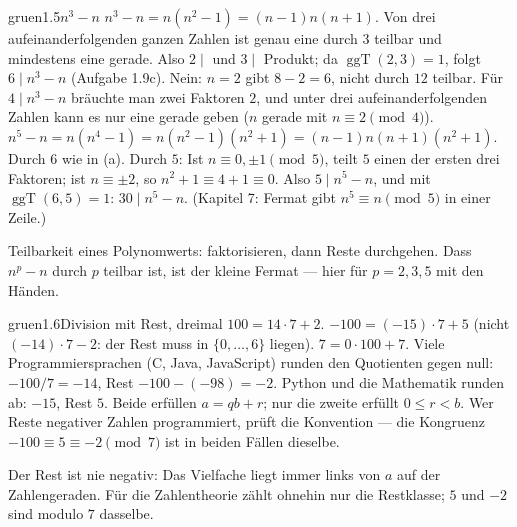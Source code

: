 \begin{loesungkarte}{gruen}{1.5}{$n^{3} - n$}
$n^{3} - n = n(n^{2} - 1) = (n - 1)n(n + 1)$. Von drei aufeinanderfolgenden ganzen Zahlen ist genau eine durch $3$ teilbar und mindestens eine gerade. Also $2\mid$ und $3\mid$ Produkt; da $\operatorname{ggT}(2, 3) = 1$, folgt $6\mid n^{3} - n$ (Aufgabe 1.9c).
Nein: $n = 2$ gibt $8 - 2 = 6$, nicht durch $12$ teilbar. Für $4\mid n^{3} - n$ bräuchte man zwei Faktoren $2$, und unter drei aufeinanderfolgenden Zahlen kann es nur eine gerade geben ($n$ gerade mit $n\equiv2\pmod4$).
$n^{5} - n = n(n^{4} - 1) = n(n^{2} - 1)(n^{2} + 1) = (n - 1)n(n + 1)(n^{2} + 1)$. Durch $6$ wie in (a). Durch $5$: Ist $n\equiv0, \pm1\pmod5$, teilt $5$ einen der ersten drei Faktoren; ist $n\equiv\pm2$, so $n^{2} + 1\equiv4 + 1\equiv0$. Also $5\mid n^{5} - n$, und mit $\operatorname{ggT}(6, 5) = 1$: $30\mid n^{5} - n$. (Kapitel 7: Fermat gibt $n^{5}\equiv n\pmod5$ in einer Zeile.)
\begin{mitnehmen}\kastentext
Teilbarkeit eines Polynomwerts: faktorisieren, dann Reste durchgehen. Dass $n^{p} - n$ durch $p$ teilbar ist, ist der kleine Fermat --- hier für $p = 2, 3, 5$ mit den Händen.
\end{mitnehmen}
\end{loesungkarte}

\begin{loesungkarte}{gruen}{1.6}{Division mit Rest, dreimal}
$100 = 14\cdot7 + 2$. \quad $-100 = (-15)\cdot7 + 5$ (nicht $(-14)\cdot7 - 2$: der Rest muss in $\{0, \dots, 6\}$ liegen). \quad $7 = 0\cdot100 + 7$.
Viele Programmiersprachen (C, Java, JavaScript) runden den Quotienten gegen null: $-100 / 7 = -14$, Rest $-100 - (-98) = -2$. Python und die Mathematik runden ab: $-15$, Rest $5$. Beide erfüllen $a = qb + r$; nur die zweite erfüllt $0\le r < b$. Wer Reste negativer Zahlen programmiert, prüft die Konvention --- die Kongruenz $-100\equiv5\equiv-2\pmod7$ ist in beiden Fällen dieselbe.
\begin{mitnehmen}\kastentext
Der Rest ist nie negativ: Das Vielfache liegt immer links von $a$ auf der Zahlengeraden. Für die Zahlentheorie zählt ohnehin nur die Restklasse; $5$ und $-2$ sind modulo $7$ dasselbe.
\end{mitnehmen}
\end{loesungkarte}

